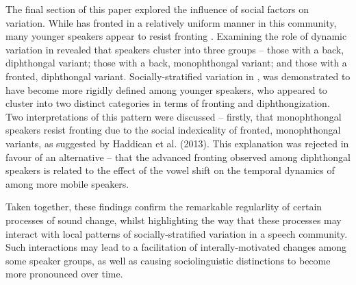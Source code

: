 \documentclass[12pt]{article}
\begin{document}
The final section of this paper explored the influence of social factors on  variation. While  has fronted in a relatively uniform manner in this community, many younger speakers appear to resist fronting . Examining the role of dynamic variation in  revealed that speakers cluster into three groups -- those with a back, diphthongal variant; those with a back, monophthongal variant; and those with a fronted, diphthongal variant. Socially-stratified variation in , was demonstrated to have become more rigidly defined among younger speakers, who appeared to cluster into two distinct categories in terms of  fronting and diphthongization. Two interpretations of this pattern were discussed -- firstly, that monophthongal speakers resist fronting due to the social indexicality of fronted, monophthongal variants, as suggested by Haddican et al. (2013). This explanation was rejected in favour of an alternative -- that the advanced fronting observed among diphthongal speakers is related to the effect of the vowel shift on the temporal dynamics of  among more mobile speakers.

Taken together, these findings confirm the remarkable regularlity of certain processes of sound change, whilst highlighting the way that these processes may interact with local patterns of socially-stratified variation in a speech community. Such interactions may lead to a facilitation of interally-motivated changes among some speaker groups, as well as causing sociolinguistic distinctions to become more pronounced over time.
\newpage

\nocite{*}

\end{document}
